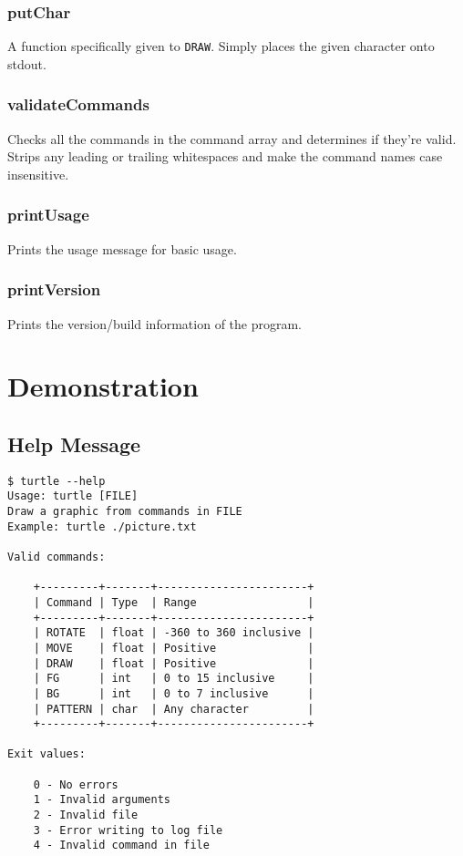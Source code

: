 \documentclass[a4paper, 12pt, titlepage]{article}
\newcommand{\code}[1]{\small\texttt{#1}\normalsize}
\begin{document}
\subsubsection{putChar}

A function specifically given to \code{DRAW}. Simply places the given 
character onto stdout.

\subsubsection{validateCommands}

Checks all the commands in the command array and determines if they're valid.
Strips any leading or trailing whitespaces and make the command names case 
insensitive.

\subsubsection{printUsage}

Prints the usage message for basic usage.

\subsubsection{printVersion}

Prints the version/build information of the program.


\newpage


\section{Demonstration}

\subsection{Help Message}

\begin{lstlisting}
$ turtle --help
Usage: turtle [FILE]
Draw a graphic from commands in FILE
Example: turtle ./picture.txt

Valid commands:

    +---------+-------+-----------------------+
    | Command | Type  | Range                 |
    +---------+-------+-----------------------+
    | ROTATE  | float | -360 to 360 inclusive |
    | MOVE    | float | Positive              |
    | DRAW    | float | Positive              |
    | FG      | int   | 0 to 15 inclusive     |
    | BG      | int   | 0 to 7 inclusive      |
    | PATTERN | char  | Any character         |
    +---------+-------+-----------------------+

Exit values:

    0 - No errors
    1 - Invalid arguments
    2 - Invalid file
    3 - Error writing to log file
    4 - Invalid command in file

\end{lstlisting}
\end{document}
